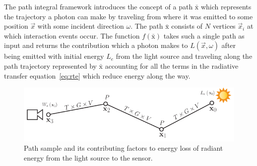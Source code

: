 The path integral framework introduces the concept of a path $\bar{\mathrm{x}}$ which represents the trajectory a photon can make by traveling from where it was emitted to some position $\vec{x}$ with some incident direction $\omega$. The path $\bar{\mathrm{x}}$ consists of $N$ vertices $\vec{x}_i$ at which interaction events occur. The function $f\left(\bar{\mathrm{x}}\right)$ takes such a single path as input and returns the contribution which a photon makes to $L(\vec{x}, \omega)$ after being emitted with initial energy $L_e$ from the light source and traveling along the path trajectory represented by $\bar{\mathrm{x}}$ accounting for all the terms in the radiative transfer equation~\ref{eq:rte} which reduce energy along the way.
\begin{figure}[t]
\centering
\includegraphics[width=1.0\textwidth]{03_foundations_of_light_transport_simulation/figures/fig_path_sample.pdf}
\caption{Path sample and its contributing factors to energy loss of radiant energy from the light source to the sensor.}
\label{fig:mc_path_sample_contributions}
\end{figure}

